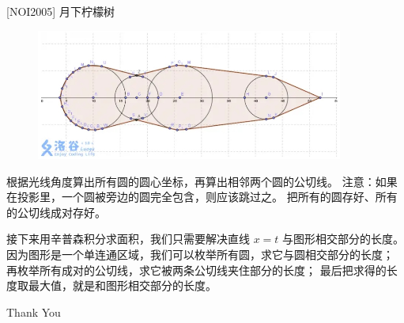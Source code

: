 \documentclass{beamer}
\begin{document}
\begin{frame}{[NOI2005] 月下柠檬树}
    \footnotesize
    \begin{figure}[H]
        \centering
        \includegraphics[width=0.9\textwidth]{pic/noi2005-3.png}
    \end{figure}

    根据光线角度算出所有圆的圆心坐标，再算出相邻两个圆的公切线。
    注意：如果在投影里，一个圆被旁边的圆完全包含，则应该跳过之。
    把所有的圆存好、所有的公切线成对存好。

    \vspace{.5em}\pause
    接下来用辛普森积分求面积，我们只需要解决直线 $x=t$ 与图形相交部分的长度。
    因为图形是一个单连通区域，我们可以枚举所有圆，求它与圆相交部分的长度；
    再枚举所有成对的公切线，求它被两条公切线夹住部分的长度；
    最后把求得的长度取最大值，就是和图形相交部分的长度。
\end{frame}

\begin{frame}
    \begin{center}
        {\Huge\calligra Thank You}
    \end{center}
\end{frame}
\end{document}
